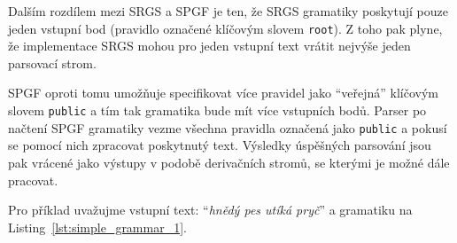 Dalším rozdílem mezi SRGS a SPGF je ten, že SRGS gramatiky poskytují pouze jeden vstupní bod (pravidlo označené klíčovým slovem \texttt{root}).
Z toho pak plyne, že implementace SRGS mohou pro jeden vstupní text vrátit nejvýše jeden parsovací strom.

SPGF oproti tomu umožňuje specifikovat více pravidel jako \enquote{veřejná} klíčovým slovem \texttt{public} a tím tak gramatika bude mít více vstupních bodů.
Parser po načtení SPGF gramatiky vezme všechna pravidla označená jako \texttt{public} a pokusí se pomocí nich zpracovat poskytnutý text.
Výsledky úspěšných parsování jsou pak vrácené jako výstupy v podobě derivačních stromů, se kterými je možné dále pracovat.

Pro příklad uvažujme vstupní text: \enquote{\emph{hnědý pes utíká pryč}} a gramatiku na Listing~\ref{lst:simple_grammar_1}.


